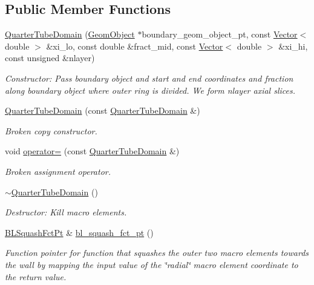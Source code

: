 \subsection*{Public Member Functions}
\begin{DoxyCompactItemize}
\item 
\hyperlink{classoomph_1_1QuarterTubeDomain_a51cea676b1cdf56cc3f1ff5fbec952f8}{Quarter\+Tube\+Domain} (\hyperlink{classoomph_1_1GeomObject}{Geom\+Object} $\ast$boundary\+\_\+geom\+\_\+object\+\_\+pt, const \hyperlink{classoomph_1_1Vector}{Vector}$<$ double $>$ \&xi\+\_\+lo, const double \&fract\+\_\+mid, const \hyperlink{classoomph_1_1Vector}{Vector}$<$ double $>$ \&xi\+\_\+hi, const unsigned \&nlayer)
\begin{DoxyCompactList}\small\item\em Constructor\+: Pass boundary object and start and end coordinates and fraction along boundary object where outer ring is divided. We form nlayer axial slices. \end{DoxyCompactList}\item 
\hyperlink{classoomph_1_1QuarterTubeDomain_a3784528b5fb419be94556912166975f8}{Quarter\+Tube\+Domain} (const \hyperlink{classoomph_1_1QuarterTubeDomain}{Quarter\+Tube\+Domain} \&)
\begin{DoxyCompactList}\small\item\em Broken copy constructor. \end{DoxyCompactList}\item 
void \hyperlink{classoomph_1_1QuarterTubeDomain_aad4f59dfaa325e7d8a67ed477114700b}{operator=} (const \hyperlink{classoomph_1_1QuarterTubeDomain}{Quarter\+Tube\+Domain} \&)
\begin{DoxyCompactList}\small\item\em Broken assignment operator. \end{DoxyCompactList}\item 
\hyperlink{classoomph_1_1QuarterTubeDomain_a191be8daa569473cebcc1466d8235175}{$\sim$\+Quarter\+Tube\+Domain} ()
\begin{DoxyCompactList}\small\item\em Destructor\+: Kill macro elements. \end{DoxyCompactList}\item 
\hyperlink{classoomph_1_1QuarterTubeDomain_a3d8c15c17d9912d8c519c028437c0b2c}{B\+L\+Squash\+Fct\+Pt} \& \hyperlink{classoomph_1_1QuarterTubeDomain_a11251924a7d83e09208138b3bedba160}{bl\+\_\+squash\+\_\+fct\+\_\+pt} ()
\begin{DoxyCompactList}\small\item\em Function pointer for function that squashes the outer two macro elements towards the wall by mapping the input value of the \char`\"{}radial\char`\"{} macro element coordinate to the return value. \end{DoxyCompactList}\item 

\end{DoxyCompactItemize}
